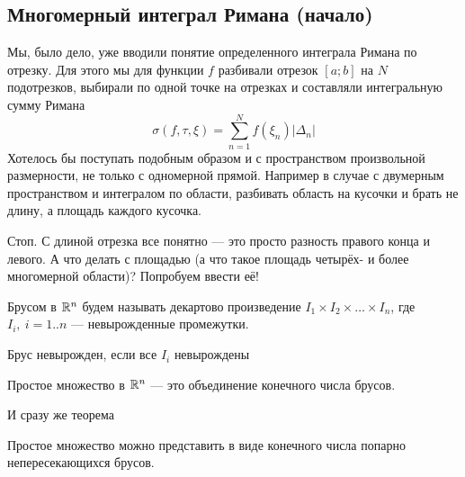 \documentclass[a4paper, 12pt]{article}
\begin{document}
	\subsection{Многомерный интеграл Римана (начало)}
	Мы, было дело, уже вводили понятие определенного интеграла Римана по отрезку. Для этого мы для функции $f$ разбивали отрезок $[a; b]$ на $N$ подотрезков, выбирали по одной точке на отрезках и составляли интегральную сумму Римана
	$$
		\sigma(f, \tau, \xi) = \sum\limits_{n =1}^{N}f(\xi_n)|\Delta_n|
	$$
	Хотелось бы поступать подобным образом и с пространством произвольной размерности, не только с одномерной прямой. Например в случае с двумерным пространством и интегралом по области, разбивать область на кусочки и брать не длину, а площадь каждого кусочка. 
	\par Стоп. С длиной отрезка все понятно --- это просто разность правого конца и левого. А что делать с площадью (а что такое площадь четырёх- и более многомерной области)? Попробуем ввести её!
	\begin{Def}
		Брусом в $\mathbb{R}^n$ будем называть декартово произведение $I_1\times I_2\times\ldots \times I_n$, где $I_i,\ i = 1..n$ --- невырожденные промежутки.
	\end{Def}
	Брус невырожден, если все $I_i$ невырождены
	\begin{Def}
		Простое множество в $\mathbb{R}^n$ --- это объединение конечного числа брусов. 
	\end{Def}
	И сразу же теорема
	\begin{Theorem}
		Простое множество можно представить в виде конечного числа попарно непересекающихся брусов.
	\end{Theorem} 
\end{document}
